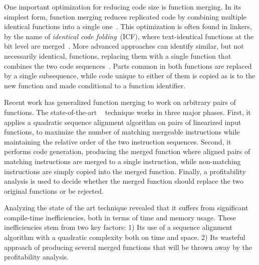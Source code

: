 One important optimization for reducing code size is function merging.
In its simplest form, function merging reduces replicated code by combining multiple identical functions into a single one~\cite{llvm-fm,livska14}.
This optimization is often found in linkers, by the name of \textit{identical code folding}~(ICF), where text-identical functions at the bit level are merged~\cite{tallam10,kwan12,msvc-icf}.
More advanced approaches can identify similar, but not necessarily identical, functions, replacing them with a single function that combines the two code sequences~\cite{edler14}. Parts common in both functions are replaced by a single subsequence, while code unique to either of them is copied as is to the new function and made conditional to a function identifier.

Recent work has generalized function merging to work on arbitrary pairs of functions.
The state-of-the-art {\SOAName}~\cite{rocha19, rocha20} technique works in three major phases.
First, it applies a quadratic sequence alignment algorithm on pairs of linearized input functions, to maximize the number of matching mergeable instructions while maintaining the relative order of the two instruction sequences.
Second, it performs code generation, producing the merged function where aligned pairs of matching instructions are merged to a single instruction, while non-matching instructions are simply copied into the merged function.
Finally, a profitability analysis is used to decide whether the merged function should replace the two original functions or be rejected.

Analyzing the state of the art technique revealed that it suffers from significant compile-time inefficiencies, both in terms of time and memory usage.
These inefficiencies stem from two key factors:
1) Its use of a sequence alignment algorithm with a quadratic complexity both on time and space.
2) Its wasteful approach of producing several merged functions that will be thrown away by the profitability analysis.


